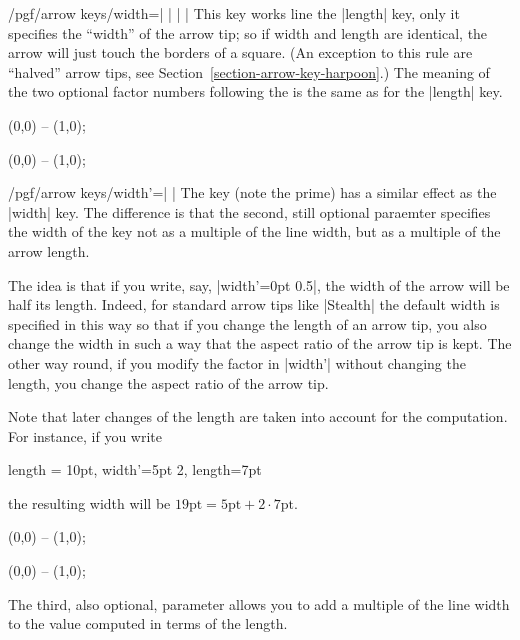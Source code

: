 \begin{key}{/pgf/arrow keys/width=| |%
    | |}
  This key works line the |length| key, only it specifies the
  ``width'' of the arrow tip; so if width and length are identical, the
  arrow will just touch the borders of a square. (An exception to this
  rule are ``halved'' arrow tips, see
  Section~\ref{section-arrow-key-harpoon}.) The meaning of the two
  optional factor numbers following the  is the same
  as for the |length| key.
\begin{codeexample}[]
\tikz \draw [arrows = {-Latex[width=10pt, length=10pt]}] (0,0) -- (1,0);
\end{codeexample}
\begin{codeexample}[]
\tikz \draw [arrows = {-Latex[width=0pt 10, length=10pt]}] (0,0) -- (1,0);
\end{codeexample}
\end{key}

\begin{key}{/pgf/arrow keys/width'=| |}
  The key (note the prime) has a similar effect as the |width|
  key. The difference is that the second, still optional paraemter
   specifies the width of the key not as a
  multiple of the line width, but as a multiple of the arrow length.

  The idea is that if you write, say, |width'=0pt 0.5|, the width of
  the arrow will be half its length. Indeed, for standard arrow tips
  like |Stealth| the default width is specified in this way so that if
  you change the length of an arrow tip, you also change the width in
  such a way that the aspect ratio of the arrow tip is kept. The other
  way round, if you modify the factor in |width'| without changing the
  length, you change the aspect ratio of the arrow tip.

  Note that later changes of the length are taken into account for the
  computation. For instance, if you write
\begin{codeexample}
length = 10pt, width'=5pt 2, length=7pt    
\end{codeexample}
  the resulting width will be $19\mathrm{pt} = 5\mathrm{pt} + 2\cdot
  7\mathrm{pt}$.

\begin{codeexample}[]
\tikz \draw [arrows = {-Latex[width'=0pt .5, length=10pt]}] (0,0) -- (1,0);
\end{codeexample}
\begin{codeexample}[]
\tikz \draw [arrows = {-Latex[width'=0pt .5, length=15pt]}] (0,0) -- (1,0);
\end{codeexample}
  The third, also optional, parameter allows you to add a multiple of
  the line width to the value computed in terms of the length.
\end{key}



